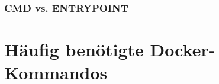\subsubsection{CMD vs. ENTRYPOINT}


\section{Häufig benötigte Docker-Kommandos}
\label{docker-kommandos}

